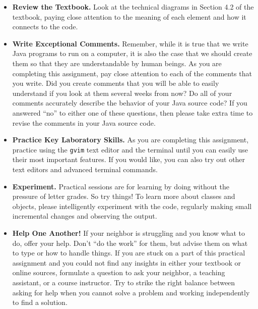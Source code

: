 \documentclass[11pt]{article}
\begin{document}
\vspace*{-.05in}
\begin{itemize}

\item {\bf Review the Textbook.} Look at the technical diagrams in Section 4.2 of the textbook, paying close attention
  to the meaning of each element and how it connects to the code.

\item {\bf Write Exceptional Comments.} Remember, while it is true that we write Java programs to run on a computer, it
  is also the case that we should create them so that they are understandable by human beings. As you are completing
  this assignment, pay close attention to each of the comments that you write. Did you create comments that you will be
  able to easily understand if you look at them several weeks from now? Do all of your comments accurately describe the
  behavior of your Java source code? If you answered ``no'' to either one of these questions, then please take extra
  time to revise the comments in your Java source code.

\item {\bf Practice Key Laboratory Skills.} As you are completing this assignment, practice using the {\tt gvim} text
  editor and the terminal until you can easily use their most important features. If you would like, you can also try
  out other text editors and advanced terminal commands.

\item {\bf Experiment.} Practical sessions are for learning by doing without the pressure of letter grades. So try
  things! To learn more about classes and objects, please intelligently experiment with the code, regularly making small
  incremental changes and observing the output.

\item {\bf Help One Another!} If your neighbor is struggling and you know what to do, offer your help. Don't ``do the
  work'' for them, but advise them on what to type or how to handle things. If you are stuck on a part of this practical
  assignment and you could not find any insights in either your textbook or online sources, formulate a question to ask
  your neighbor, a teaching assistant, or a course instructor. Try to strike the right balance between asking for help
  when you cannot solve a problem and working independently to find a solution.

\end{itemize}
\end{document}
